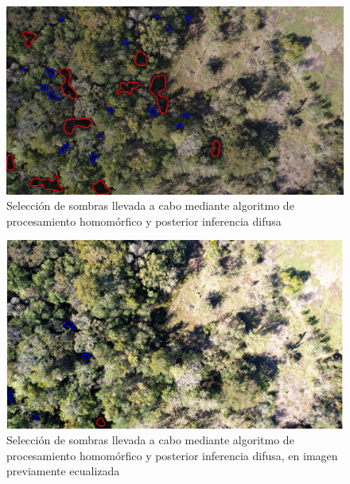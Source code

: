 \begin{figure}
    \includegraphics[width=\textwidth]{Imagenes/Comparativo Homo-IIC/180_fzz.png}
     \hfill
     \caption{Selección de sombras llevada a cabo mediante algoritmo de procesamiento homomórfico y posterior inferencia difusa}
    \label{180_fzz}
\end{figure}
\begin{figure}
    \includegraphics[width=\textwidth]{Imagenes/Comparativo Homo-IIC/180_eq_fzz.png}
     \hfill
     \caption{Selección de sombras llevada a cabo mediante algoritmo de procesamiento homomórfico y posterior inferencia difusa, en imagen previamente ecualizada}
    \label{180_eq_fzz}
\end{figure}

